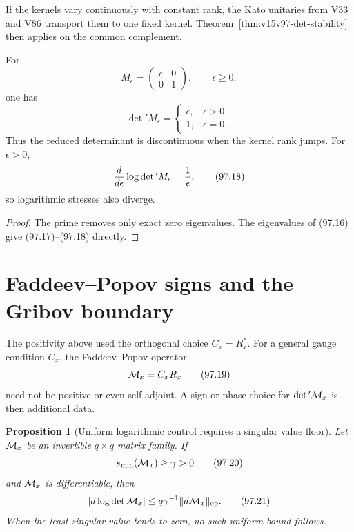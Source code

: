 \documentclass[11pt]{article}
\newtheorem{proposition}[theorem]{Proposition}
\theoremstyle{remark}
\begin{document}
If the kernels vary continuously with constant rank, the Kato
unitaries from V33 and V86 transport them to one fixed kernel.
Theorem~\ref{thm:v15v97-det-stability} then applies on the common
complement.

\begin{counterexample}
\label{cnt:v15v97-jump}
For
\[
 M_\epsilon=
 \begin{pmatrix}\epsilon&0\\0&1\end{pmatrix},
 \qquad \epsilon\geq0,                                \tag{97.16}
\]
one has
\[
 \det{}'M_\epsilon=
 \begin{cases}
 \epsilon,&\epsilon>0,\\
 1,&\epsilon=0.
 \end{cases}                                          \tag{97.17}
\]
Thus the reduced determinant is discontinuous when the kernel rank
jumps.  For \(\epsilon>0\),
\[
 {d\over d\epsilon}\log\det{}'M_\epsilon={1\over\epsilon},          \tag{97.18}
\]
so logarithmic stresses also diverge.
\end{counterexample}

\begin{proof}
The prime removes only exact zero eigenvalues.  The eigenvalues of
(97.16) give (97.17)--(97.18) directly.
\end{proof}

\section{Faddeev--Popov signs and the Gribov boundary}

The positivity above used the orthogonal choice \(C_x=R_x^*\).  For
a general gauge condition \(C_x\), the Faddeev--Popov operator
\[
 {\cal M}_x=C_xR_x                                    \tag{97.19}
\]
need not be positive or even self-adjoint.  A sign or phase choice
for \(\det{}'{\cal M}_x\) is then additional data.

\begin{proposition}[Uniform logarithmic control requires a singular
value floor]
\label{prop:v15v97-singular}
Let \({\cal M}_x\) be an invertible \(q\times q\) matrix family.
If
\[
 s_{\min}({\cal M}_x)\geq\gamma>0                     \tag{97.20}
\]
and \({\cal M}_x\) is differentiable, then
\[
 |d\log\det{\cal M}_x|
 \leq q\gamma^{-1}\|d{\cal M}_x\|_{\rm op}.            \tag{97.21}
\]
When the least singular value tends to zero, no such uniform bound
follows.
\end{proposition}
\end{document}

